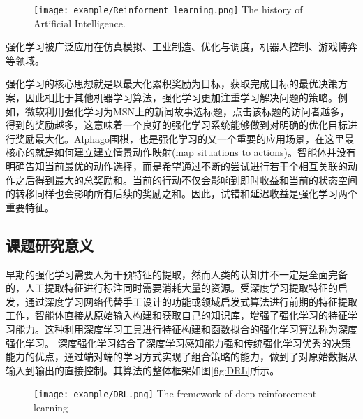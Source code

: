 \begin{figure}[htpb]
	\centering
	\texttt{[image: example/Reinforment\_learning.png]}
	{The history of Artificial Intelligence.}
	\label{fig:2}
\end{figure}

强化学习被广泛应用在仿真模拟\cite{傅启明2014一种基于线性函数逼近的离策略}、工业制造\cite{高阳2007平均奖赏强化学习算法研究}、优化与调度\cite{魏英姿2005一种基于强化学习的作业车间动态调度方法}，机器人控制\cite{Ipek2008Self}、游戏博弈\cite{Tesauro1944TD}等领域。

强化学习的核心思想就是以最大化累积奖励为目标，获取完成目标的最优决策方案，因此相比于其他机器学习算法，强化学习更加注重学习解决问题的策略。例如，微软利用强化学习为MSN上的新闻故事选标题，点击该标题的访问者越多，得到的奖励越多，这意味着一个良好的强化学习系统能够做到对明确的优化目标进行奖励最大化。Alphago围棋，也是强化学习的又一个重要的应用场景，在这里最核心的就是如何建立建立情景\raisebox{0.3mm}{----}动作映射(map situations to actions)。智能体并没有明确告知当前最优的动作选择，而是希望通过不断的尝试进行若干个相互关联的动作之后得到最大的总奖励和。当前的行动不仅会影响到即时收益和当前的状态空间的转移同样也会影响所有后续的奖励之和。因此，试错和延迟收益是强化学习两个重要特征。
\subsection{课题研究意义}
早期的强化学习需要人为干预特征的提取，然而人类的认知并不一定是全面完备的，人工提取特征进行标注同时需要消耗大量的资源。受深度学习提取特征的启发，通过深度学习网络代替手工设计的功能或领域启发式算法进行前期的特征提取工作，智能体直接从原始输入构建和获取自己的知识库，增强了强化学习的特征学习能力。这种利用深度学习工具进行特征构建和函数拟合的强化学习算法称为深度强化学习。
深度强化学习结合了深度学习感知能力强和传统强化学习优秀的决策能力的优点，通过端对端的学习方式实现了组合策略的能力，做到了对原始数据从输入到输出的直接控制。其算法的整体框架如图\ref{fig:DRL}所示。
\begin{figure}[h]
	\centering
	\texttt{[image: example/DRL.png]}
	{The fremework of deep reinforcement learning}
	\label{DRL}
\end{figure}

